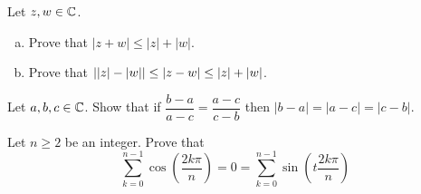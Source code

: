 
\question Let $z,w\in\mathbb{C}$.
\begin{enumerate}[(a)]
  \item Prove that $|z+w| \leq |z| + |w|$.
  \item Prove that $\abs{|z| - |w|} \leq |z-w| \leq |z|+|w|$.
\end{enumerate}

\question Let $a,b,c\in\mathbb{C}$.
Show that if $\dfrac{b-a}{a-c} = \dfrac{a-c}{c-b}$ then $|b-a| = |a-c| = |c-b|$.

\question Let $n \geq 2$ be an integer. Prove that
\[ \sum_{k=0}^{n-1}\cos\left(\frac{2k\pi}{n}\right)=0=\sum_{k=0}^{n-1}\sin\left(t\frac{2k\pi}{n}\right) \]

